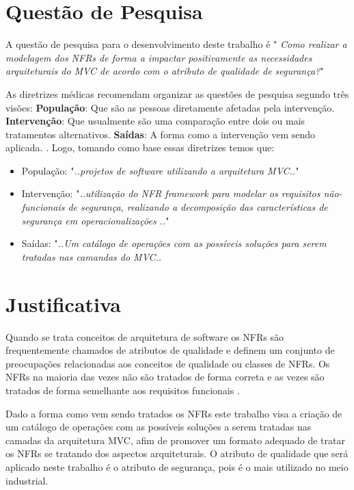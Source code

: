 \section{Questão de Pesquisa}
A questão de pesquisa para o desenvolvimento deste trabalho é " \textit{Como realizar a modelagem dos NFRs de forma a impactar positivamente as necessidades arquiteturais do MVC de acordo com o atributo de qualidade de segurança?}"

As diretrizes médicas recomendam organizar as questões de pesquisa segundo três visões: \textbf{População}: Que são as pessoas diretamente afetadas pela intervenção. \textbf{Intervenção}: Que usualmente são uma comparação entre dois ou mais tratamentos alternativos. \textbf{Saídas}: A forma como a intervenção vem sendo aplicada. \cite{keele2007guidelines}. Logo, tomando como base essas diretrizes temos que: 

\begin{itemize}
	\item População: "\textit{..projetos de software utilizando a arquitetura MVC..}"
	\item Intervenção: "\textit{..utilização do NFR framework para modelar os requisitos não-funcionais de segurança, realizando a decomposição das características de segurança em operacionalizações  ..}"
	\item Saídas: "\textit{..Um catálogo de operações com as possíveis soluções para serem tratadas nas camandas do MVC..}
\end{itemize}
\section{Justificativa}

Quando se trata conceitos de arquitetura de software os NFRs são frequentemente chamados de atributos de qualidade e definem um conjunto de preocupações relacionadas aos conceitos de qualidade \cite{schneidewind1990standard} ou classes de NFRs. Os NFRs na maioria das vezes não são tratados de forma correta e as vezes são tratados de forma semelhante aos requisitos funcionais \cite{eckhardt2016non}.

Dado a forma como vem sendo tratados os NFRs este trabalho visa a criação de um catálogo de operações com as possíveis soluções a serem tratadas nas camadas da arquitetura MVC, afim de promover um formato adequado de tratar os NFRs se tratando dos aspectos arquiteturais. O atributo de qualidade que será aplicado neste trabalho é o atributo de segurança, pois é o mais utilizado no meio industrial.  

